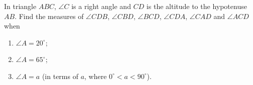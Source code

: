 In triangle $ABC$, $\angle C$ is a right angle and $CD$ is the altitude to the hypotenuse $AB$. Find the measures of $\angle CDB$, $\angle CBD$, $\angle BCD$, $\angle CDA$, $\angle CAD$ and $\angle ACD$ when
\begin{enumerate}
\item[(a)] $\angle A=20^\circ$;
\item[(b)] $\angle A=65^\circ$;
\item[(c)] $\angle A=a$ (in terms of $a$, where $0^\circ<a<90^\circ$).
\end{enumerate}
